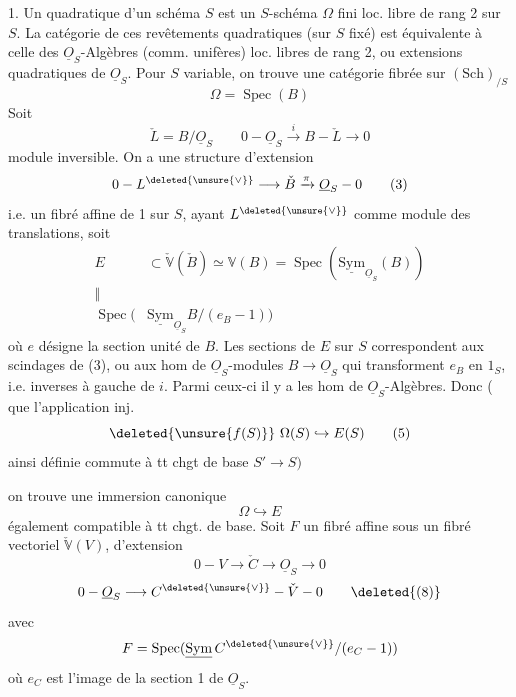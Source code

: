 1. Un  quadratique d'un schéma $S$ est un
$S$-schéma $\Omega$ fini loc. libre de rang 2 sur $S$. La catégorie
de ces revêtements quadratiques (sur $S$ fixé) est
équivalente à celle des $\underline{O}_S$-Algèbres (comm. unifères)
 loc. libres de rang 2, ou  extensions quadratiques
de $\underline{O}_S$. Pour $S$ variable, on trouve une catégorie
fibrée sur $(\mathrm{Sch})_{/S}$
\[
\Omega=\operatorname{Spec}(B) \tag*{(1)}
\]
Soit 
\[
\check L=B/\underline{O}_S\qquad 0\mathbin{-}\underline{O}_S\xrightarrow{i}B\mathbin{-}\check L\longrightarrow0 \tag*{(2)}
\]
module inversible. On a une structure d'extension
\[
0\mathbin{-}L^{\deleted{\unsure{\vee}}}\longrightarrow\check B\xrightarrow{\pi}\underline{O}_S\mathbin{-}0 \tag*{(3)}
\]
i.e. un fibré affine de  1 sur $S$, ayant
$L^{\deleted{\unsure{\vee}}}$ comme module des translations, 
soit
\[
\begin{aligned}
 E&\subset\check{\mathbb V}(\check B)\simeq\mathbb V(B)=\operatorname{Spec}(\underline{\mathrm{Sym}}_{\underline{O}_S}(B))\\
 \Vert&\\[-3pt]
 \operatorname{Spec}(&\underline{\mathrm{Sym}}_{\underline{O}_S} B/(e_B-1))
\end{aligned} \tag*{(4)}
\]
où $e$ désigne la section unité de $B$. Les sections de
$E$ sur $S$ correspondent aux scindages de (3), ou
aux hom de $\underline{O}_S$-modules $B\longrightarrow\underline{O}_S$ qui
transforment $e_B$ en $1_S$, i.e. inverses à gauche de $i$.
Parmi ceux-ci il y a les  hom de
$\underline{O}_S$-Algèbres. Donc ( que l'application inj.
\[
\deleted{\unsure{f(S)}}\ \Omega(S)\hookrightarrow E(S) \tag*{(5)}
\]
ainsi définie commute à tt chgt de base $S'\longrightarrow S)$


on trouve une  immersion canonique
\[
\Omega\hookrightarrow E \tag*{(6)}
\]
également compatible à tt chgt. de base. Soit
 $F$ un fibré affine sous
un fibré vectoriel $\check{\mathbb V}(V)$, 
 d'extension
\[
0\mathbin{-}V\longrightarrow\check C\longrightarrow\underline{O}_S\longrightarrow0 \tag*{(7)}
\]
\[
0\mathbin{-}\underline{O}_S\longrightarrow C^{\deleted{\unsure{\vee}}}\mathbin{-}\check V\mathbin{-}0 \tag*{\deleted{(8)}}
\]
avec
\[
F=\operatorname{Spec}(\underline{\mathrm{Sym}}\, C^{\deleted{\unsure{\vee}}}/(e_C-1))
\]
où $e_C$ est l'image  de la section 1 de $\underline{O}_S$.

